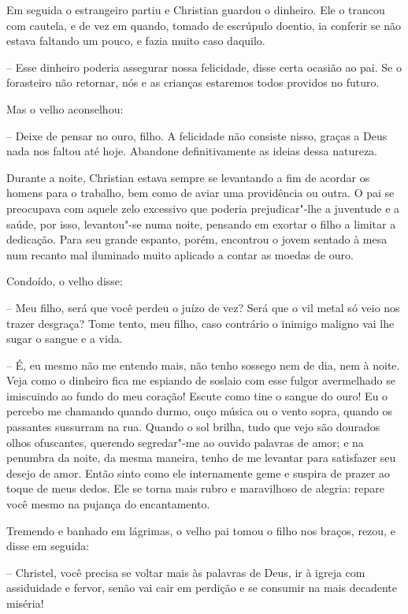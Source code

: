 Em seguida o estrangeiro partiu e Christian guardou o dinheiro. Ele o
trancou com cautela, e de vez em quando, tomado de escrúpulo doentio,
ia conferir se não estava faltando um pouco, e fazia muito caso
daquilo.

-- Esse dinheiro poderia assegurar nossa felicidade, disse certa
ocasião ao pai. Se o forasteiro não retornar, nós e as crianças
estaremos todos providos no futuro.

Mas o velho aconselhou:

-- Deixe de pensar no ouro, filho. A felicidade não consiste nisso,
graças a Deus nada nos faltou até hoje. Abandone definitivamente as
ideias dessa natureza.

Durante a noite, Christian estava sempre se levantando a fim de acordar
os homens para o trabalho, bem como de aviar uma providência ou outra.
O pai se preocupava com aquele zelo excessivo que poderia
prejudicar"-lhe a juventude e a saúde, por isso, levantou"-se numa noite,
pensando em exortar o filho a limitar a dedicação. Para seu grande
espanto, porém, encontrou o jovem sentado à mesa num recanto mal
iluminado muito aplicado a contar as moedas de ouro.

Condoído, o velho disse:

-- Meu filho, será que você perdeu o juízo de vez? Será que o vil
metal só veio nos trazer desgraça? Tome tento, meu filho, caso
contrário o inimigo maligno vai lhe sugar o sangue e a vida.

-- É, eu mesmo não me entendo mais, não tenho sossego nem de dia, nem
à noite. Veja como o dinheiro fica me espiando de soslaio com esse
fulgor avermelhado se imiscuindo ao fundo do meu coração! Escute como
tine o sangue do ouro! Eu o percebo me chamando quando durmo, ouço
música ou o vento sopra, quando os passantes sussurram na rua. Quando o
sol brilha, tudo que vejo são dourados olhos ofuscantes, querendo
segredar"-me ao ouvido palavras de amor; e na penumbra da noite, da
mesma maneira, tenho de me levantar para satisfazer seu desejo de amor.
Então sinto como ele internamente geme e suspira de prazer ao toque de
meus dedos. Ele se torna mais rubro e maravilhoso de alegria: repare
você mesmo na pujança do encantamento.

Tremendo e banhado em lágrimas, o velho pai tomou o filho nos braços,
rezou, e disse em seguida:

-- Christel, você precisa se voltar mais às palavras de Deus, ir à
igreja com assiduidade e fervor, senão vai cair em perdição e se consumir na
mais decadente miséria!

